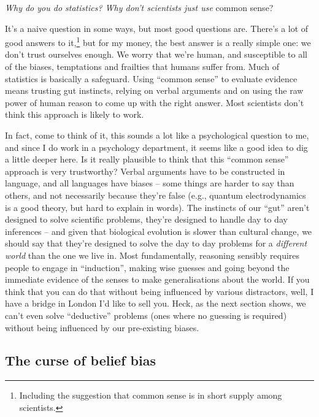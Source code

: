 \documentclass[
  letterpaper,
]{book}
\begin{document}
\emph{Why do you do statistics? Why don't scientists just use} common
sense?

It's a naive question in some ways, but most good questions are. There's
a lot of good answers to it,\footnote{Including the suggestion that
  common sense is in short supply among scientists.} but for my money,
the best answer is a really simple one: we don't trust ourselves enough.
We worry that we're human, and susceptible to all of the biases,
temptations and frailties that humans suffer from. Much of statistics is
basically a safeguard. Using ``common sense'' to evaluate evidence means
trusting gut instincts, relying on verbal arguments and on using the raw
power of human reason to come up with the right answer. Most scientists
don't think this approach is likely to work.

In fact, come to think of it, this sounds a lot like a psychological
question to me, and since I do work in a psychology department, it seems
like a good idea to dig a little deeper here. Is it really plausible to
think that this ``common sense'' approach is very trustworthy? Verbal
arguments have to be constructed in language, and all languages have
biases -- some things are harder to say than others, and not necessarily
because they're false (e.g., quantum electrodynamics is a good theory,
but hard to explain in words). The instincts of our ``gut'' aren't
designed to solve scientific problems, they're designed to handle day to
day inferences -- and given that biological evolution is slower than
cultural change, we should say that they're designed to solve the day to
day problems for a \emph{different world} than the one we live in. Most
fundamentally, reasoning sensibly requires people to engage in
``induction'', making wise guesses and going beyond the immediate
evidence of the senses to make generalisations about the world. If you
think that you can do that without being influenced by various
distractors, well, I have a bridge in London I'd like to sell you. Heck,
as the next section shows, we can't even solve ``deductive'' problems
(ones where no guessing is required) without being influenced by our
pre-existing biases.

\hypertarget{the-curse-of-belief-bias}{%
\subsection{The curse of belief bias}\label{the-curse-of-belief-bias}}
\end{document}
